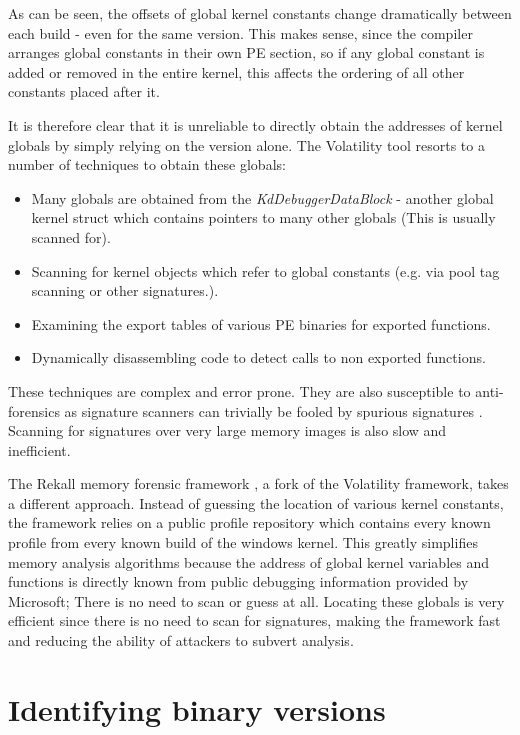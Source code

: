 As can be seen, the offsets of global kernel constants change dramatically
between each build - even for the same version. This makes sense, since the
compiler arranges global constants in their own PE section, so if any global
constant is added or removed in the entire kernel, this affects the ordering of
all other constants placed after it.

It is therefore clear that it is unreliable to directly obtain the addresses of
kernel globals by simply relying on the version alone. The Volatility tool
resorts to a number of techniques to obtain these globals:

\begin{itemize}
\item Many globals are obtained from the {\em KdDebuggerDataBlock} - another
  global kernel struct which contains pointers to many other globals (This is
  usually scanned for).

\item Scanning for kernel objects which refer to global constants (e.g. via pool
  tag scanning or other signatures.).

\item Examining the export tables of various PE binaries for exported functions.

\item Dynamically disassembling code to detect calls to non exported functions.
\end{itemize}

These techniques are complex and error prone. They are also susceptible to
anti-forensics as signature scanners can trivially be fooled by spurious
signatures \citep{add}. Scanning for signatures over very large memory images is
also slow and inefficient.

The Rekall memory forensic framework \citep{rekall}, a fork of the Volatility
framework, takes a different approach. Instead of guessing the location of
various kernel constants, the framework relies on a public profile repository
which contains every known profile from every known build of the windows
kernel. This greatly simplifies memory analysis algorithms because the address
of global kernel variables and functions is directly known from public debugging
information provided by Microsoft; There is no need to scan or guess at
all. Locating these globals is very efficient since there is no need to scan for
signatures, making the framework fast and reducing the ability of attackers to
subvert analysis.

\section{Identifying binary versions}
\label{identifying}

